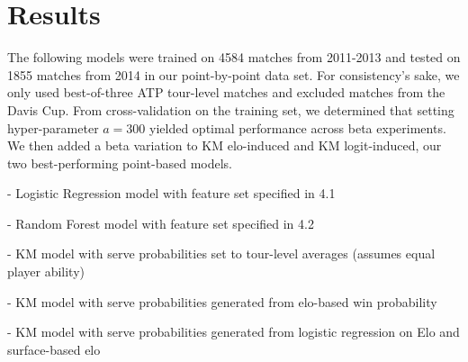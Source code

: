 \documentclass[chapterprefix=false]{report}
\begin{document}







\section{Results}

The following models were trained on 4584 matches from 2011-2013 and tested on 1855 matches from 2014 in our point-by-point data set. For consistency's sake, we only used best-of-three ATP tour-level matches and excluded matches from the Davis Cup. From cross-validation on the training set, we determined that setting hyper-parameter $a=300$ yielded optimal performance across beta experiments. We then added a beta variation to KM elo-induced and KM logit-induced, our two best-performing point-based models.

\begin{description}[leftmargin=1.7cm, labelindent=1.7cm]
\item[LR] - Logistic Regression model with feature set specified in 4.1

\item[RF] - Random Forest model with feature set specified in 4.2

\item[Equivalent] - KM model with serve probabilities set to tour-level averages (assumes equal player ability)

\item[elo-induced] - KM model with serve probabilities generated from elo-based win probability

\item[logit-induced] - KM model with serve probabilities generated from logistic regression on Elo and surface-based elo
\end{description}
\end{document}
